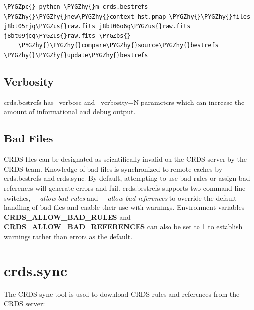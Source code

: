 \documentclass[letterpaper,10pt,english]{sphinxmanual}
\def\PYGZbs{\char`\\}
\def\PYGZus{\char`\_}
\def\PYGZpc{\char`\%}
\def\PYGZhy{\char`\-}
\begin{document}
\begin{Verbatim}[commandchars=\\\{\}]
\PYGZpc{} python \PYGZhy{}m crds.bestrefs \PYGZhy{}\PYGZhy{}new\PYGZhy{}context hst.pmap \PYGZhy{}\PYGZhy{}files j8bt05njq\PYGZus{}raw.fits j8bt06o6q\PYGZus{}raw.fits j8bt09jcq\PYGZus{}raw.fits \PYGZbs{}
    \PYGZhy{}\PYGZhy{}compare\PYGZhy{}source\PYGZhy{}bestrefs \PYGZhy{}\PYGZhy{}update\PYGZhy{}bestrefs
\end{Verbatim}


\subsection{Verbosity}
\label{command_line_tools:verbosity}
crds.bestrefs has --verbose and --verbosity=N parameters which can increase the amount of informational
and debug output.


\subsection{Bad Files}
\label{command_line_tools:bad-files}
CRDS files can be designated as scientifically invalid on the CRDS server by the CRDS team.   Knowledge of bad
files is synchronized to remote caches by crds.bestrefs and crds.sync.  By default, attempting to use bad rules or
assign bad references will generate errors and fail.   crds.bestrefs supports two command line switches,
\emph{---allow-bad-rules} and \emph{---allow-bad-references} to override the default handling of bad files and enable their
use with warnings.  Environment variables \textbf{CRDS\_ALLOW\_BAD\_RULES} and \textbf{CRDS\_ALLOW\_BAD\_REFERENCES} can also be
set to 1 to establish warnings rather than errors as the default.


\section{crds.sync}
\label{command_line_tools:crds-sync}
The CRDS sync tool is used to download CRDS rules and references from the CRDS server:
\end{document}
